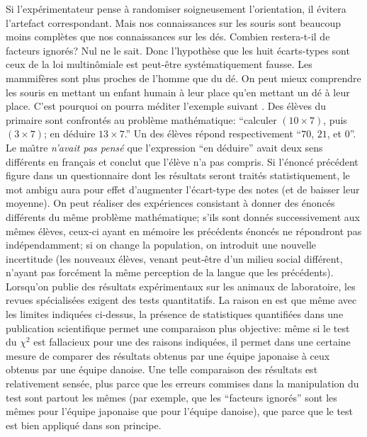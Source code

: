 \medskip 
Si l'exp\'erimentateur pense \`a randomiser soigneusement
l'orientation,  il \'evitera l'artefact correspondant. Mais nos
connaissances sur les souris sont beaucoup moins compl\`etes que nos
connaissances sur les d\'es. Combien restera-t-il de facteurs ignor\'es?
Nul ne le sait. Donc l'hypoth\`ese que les huit \'ecarts-types sont ceux
de la loi multin\^omiale est peut-\^etre syst\'ematiquement fausse. 
\medskip
Les mammif\`eres sont plus proches de l'homme que du d\'e. On peut 
mieux comprendre les souris en mettant un enfant humain \`a leur place
qu'en mettant un d\'e \`a leur place.  C'est pourquoi on pourra m\'editer
l'exemple suivant . Des \'el\`eves du primaire sont 
confront\'es au probl\`eme math\'ematique: ``calculer $(10 \times 7)$, 
puis $(3 \times 7)$; en d\'eduire $13 \times 7$.'' Un des \'el\`eves
r\'epond respectivement ``$70$, $21$, et $0$''. Le ma{\^\i}tre {\it n'avait
pas pens\'e} que l'expression ``en d\'eduire'' avait deux sens diff\'erents
en fran\c{c}ais et conclut que l'\'el\`eve n'a pas compris. Si l'\'enonc\'e
pr\'ec\'edent figure dans un questionnaire dont les r\'esultats seront
trait\'es statistiquement, le mot ambigu aura pour effet d'augmenter
l'\'ecart-type des notes (et de baisser leur moyenne). On peut r\'ealiser 
des exp\'eriences consistant \`a donner des \'enonc\'es diff\'erents du
m\^eme probl\`eme math\'ematique; s'ils sont donn\'es successivement 
aux m\^emes \'el\`eves,  ceux-ci ayant en m\'emoire les pr\'ec\'edents
\'enonc\'es ne r\'epondront pas ind\'ependamment; si on change la
population, on introduit une nouvelle incertitude (les nouveaux \'el\`eves,
venant peut-\^etre d'un milieu social diff\'erent, n'ayant pas forc\'ement 
la m\^eme perception de la langue que les pr\'ec\'edents). 
\medskip
Lorsqu'on publie des r\'esultats exp\'erimentaux sur les animaux de
laboratoire, les revues sp\'ecialis\'ees exigent des tests quantitatifs. 
La raison en est que m\^eme avec les limites indiqu\'ees ci-dessus, la
pr\'esence de statistiques quantifi\'ees dans une publication 
scientifique permet une comparaison plus objective: m\^eme si le test 
du $\chi^2$ est fallacieux pour une des raisons indiqu\'ees, il permet 
dans une certaine mesure de comparer des r\'esultats obtenus par une
\'equipe japonaise \`a ceux obtenus par une \'equipe danoise. 
\medskip
Une telle comparaison des r\'esultats est relativement sens\'ee, plus
parce que les erreurs commises dans la manipulation du test sont 
partout les m\^emes (par exemple, que les ``facteurs ignor\'es'' sont les
m\^emes pour l'\'equipe japonaise que pour l'\'equipe danoise), que 
parce que le test est bien appliqu\'e dans son principe.

